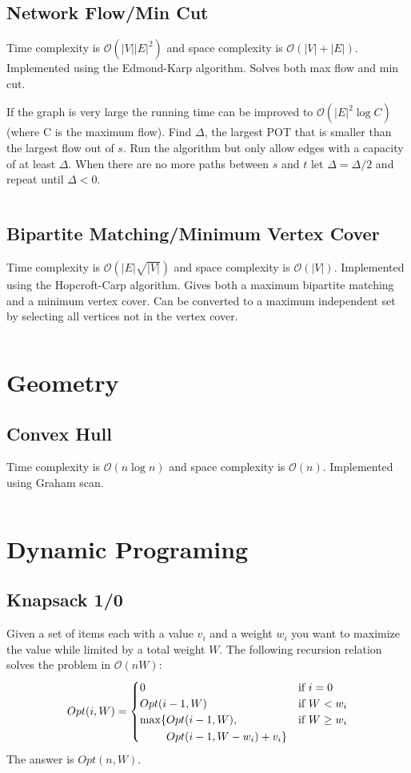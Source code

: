 \documentclass[8pt,a4paper,landscape,oneside]{amsart}
\newcommand{\code}[1]{\inputminted[fontsize=\normalsize,baselinestretch=1]{java}{code/#1}}
\newcommand{\bigO}{\mathcal{O}}
\begin{document}
\begin{multicols*}{3}
  \subsection{Network Flow/Min Cut}
  Time complexity is $\bigO(|V||E|^2)$ and space complexity is $\bigO(|V|+|E|)$. Implemented using the Edmond-Karp algorithm. Solves both max flow and min cut.
  
  If the graph is very large the running time can be improved to $\bigO(|E|^2 \log{C})$ (where C is the maximum flow). Find $\Delta$, the largest POT that is smaller than the largest flow out of $s$. Run the algorithm but only allow edges with a capacity of at least $\Delta$. When there are no more paths between $s$ and $t$ let $\Delta = \Delta / 2$ and repeat until $\Delta < 0$.
  \code{Graphs/NetworkFlow.java}
  
  \subsection{Bipartite Matching/Minimum Vertex Cover}
  Time complexity is $\bigO(|E|\sqrt{|V|})$ and space complexity is $\bigO(|V|)$. Implemented using the Hopcroft-Carp algorithm. Gives both a maximum bipartite matching and a minimum vertex cover. Can be converted to a maximum independent set by selecting all vertices not in the vertex cover.
  \code{Graphs/HopcroftCarp.java}
  
  
\section{Geometry}
  \subsection{Convex Hull}
  Time complexity is $\bigO(n\log{n})$ and space complexity is $\bigO(n)$. Implemented using Graham scan.
  \code{Geometry/GrahamScan.java}
  
\section{Dynamic Programing}
  \subsection{Knapsack 1/0}
  Given a set of items each with a value $v_i$ and a weight $w_i$ you want to maximize the value while limited by a total weight $W$. The following recursion relation solves the problem in $\bigO(nW)$:
  \[
  Opt(i,W) = \begin{cases}
  0 & \text{if } i=0 \\
  Opt(i-1,W) & \text{if } W<w_i \\
  \begin{aligned}[t]\arraycolsep=0pt
    \max\lbrace &
      Opt(i-1,W), \\ &
      Opt(i-1,W-w_i) + v_i \rbrace
  \end{aligned} & \text{if } W \geq w_i
  \end{cases}
  \]
  The answer is $Opt(n, W)$.
  

\end{multicols*}
\end{document}
